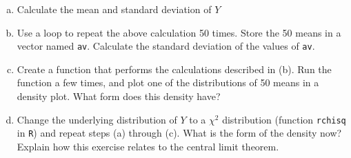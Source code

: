 \documentclass[12pt,letterpaper]{article}
\begin{document}
\begin{enumerate}[(a)]
	\item Calculate the mean and standard deviation of $Y$
	\item Use a loop to repeat the above calculation 50 times.  Store the 50 means in a vector named \texttt{av}. Calculate the standard deviation of the values of \texttt{av}.
	\item Create a function that performs the calculations described in (b). Run the function a few times, and plot one of the distributions of 50 means in a density plot. What form does this density have? 
	\item Change the underlying distribution of $Y$ to a $\chi^2$ distribution (function \texttt{rchisq} in \texttt{R}) and repeat steps (a) through (c). What is the form of the density now? Explain how this exercise relates to the central limit theorem.
\end{enumerate}
\end{document}
